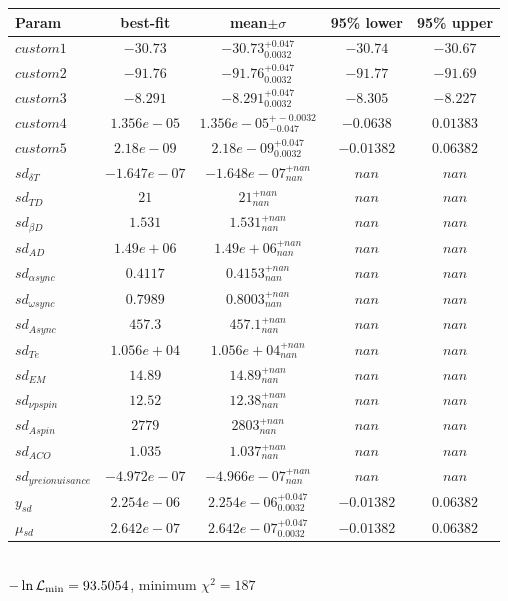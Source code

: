 \begin{tabular}{|l|c|c|c|c|} 
 \hline 
Param & best-fit & mean$\pm\sigma$ & 95\% lower & 95\% upper \\ \hline 
$custom1$ &$-30.73$ & $-30.73_{0.0032}^{+0.047}$ & $-30.74$ & $-30.67$ \\ 
$custom2$ &$-91.76$ & $-91.76_{0.0032}^{+0.047}$ & $-91.77$ & $-91.69$ \\ 
$custom3$ &$-8.291$ & $-8.291_{0.0032}^{+0.047}$ & $-8.305$ & $-8.227$ \\ 
$custom4$ &$1.356e-05$ & $1.356e-05_{-0.047}^{+-0.0032}$ & $-0.0638$ & $0.01383$ \\ 
$custom5$ &$2.18e-09$ & $2.18e-09_{0.0032}^{+0.047}$ & $-0.01382$ & $0.06382$ \\ 
$sd_{\delta{} T }$ &$-1.647e-07$ & $-1.648e-07_{nan}^{+nan}$ & $nan$ & $nan$ \\ 
$sd_{T D }$ &$21$ & $21_{nan}^{+nan}$ & $nan$ & $nan$ \\ 
$sd_{\beta{} D }$ &$1.531$ & $1.531_{nan}^{+nan}$ & $nan$ & $nan$ \\ 
$sd_{A D }$ &$1.49e+06$ & $1.49e+06_{nan}^{+nan}$ & $nan$ & $nan$ \\ 
$sd_{\alpha{} sync }$ &$0.4117$ & $0.4153_{nan}^{+nan}$ & $nan$ & $nan$ \\ 
$sd_{\omega{} sync }$ &$0.7989$ & $0.8003_{nan}^{+nan}$ & $nan$ & $nan$ \\ 
$sd_{A sync }$ &$457.3$ & $457.1_{nan}^{+nan}$ & $nan$ & $nan$ \\ 
$sd_{T e }$ &$1.056e+04$ & $1.056e+04_{nan}^{+nan}$ & $nan$ & $nan$ \\ 
$sd_{EM }$ &$14.89$ & $14.89_{nan}^{+nan}$ & $nan$ & $nan$ \\ 
$sd_{\nu{} p spin }$ &$12.52$ & $12.38_{nan}^{+nan}$ & $nan$ & $nan$ \\ 
$sd_{A spin }$ &$2779$ & $2803_{nan}^{+nan}$ & $nan$ & $nan$ \\ 
$sd_{A CO }$ &$1.035$ & $1.037_{nan}^{+nan}$ & $nan$ & $nan$ \\ 
$sd_{y reio nuisance }$ &$-4.972e-07$ & $-4.966e-07_{nan}^{+nan}$ & $nan$ & $nan$ \\ 
$y_{sd }$ &$2.254e-06$ & $2.254e-06_{0.0032}^{+0.047}$ & $-0.01382$ & $0.06382$ \\ 
$\mu{}_{sd }$ &$2.642e-07$ & $2.642e-07_{0.0032}^{+0.047}$ & $-0.01382$ & $0.06382$ \\ 
\hline 
 \end{tabular} \\ 
$-\ln{\cal L}_\mathrm{min} =93.5054$, minimum $\chi^2=187$ \\ 

